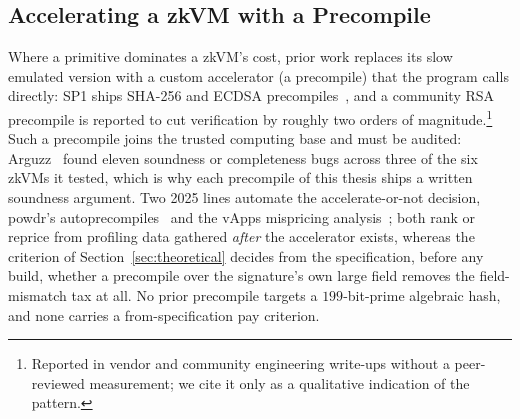 \subsection{Accelerating a zkVM with a Precompile}
Where a primitive dominates a zkVM's cost, prior work replaces its slow emulated version with a custom accelerator (a precompile) that the program calls directly: SP1 ships SHA-256 and ECDSA precompiles~\cite{succinct2024sp1}, and a community RSA precompile is reported to cut verification by roughly two orders of magnitude.\footnote{Reported in vendor and community engineering write-ups without a peer-reviewed measurement; we cite it only as a qualitative indication of the pattern.} Such a precompile joins the trusted computing base and must be audited: Arguzz~\cite{hochrainer2025arguzz} found eleven soundness or completeness bugs across three of the six zkVMs it tested, which is why each precompile of this thesis ships a written soundness argument. Two 2025 lines automate the accelerate-or-not decision, powdr's autoprecompiles~\cite{powdr2025autoprecompiles} and the vApps mispricing analysis~\cite{vapps2025}; both rank or reprice from profiling data gathered \emph{after} the accelerator exists, whereas the criterion of Section~\ref{sec:theoretical} decides from the specification, before any build, whether a precompile over the signature's own large field removes the field-mismatch tax at all. No prior precompile targets a $199$-bit-prime algebraic hash, and none carries a from-specification pay criterion.

